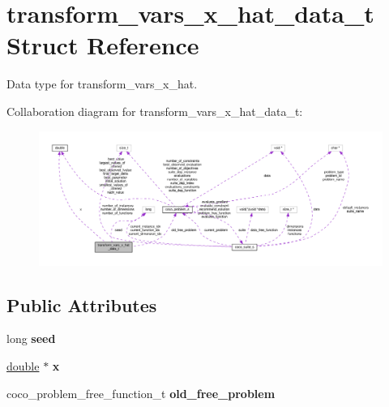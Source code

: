 \hypertarget{structtransform__vars__x__hat__data__t}{}\section{transform\+\_\+vars\+\_\+x\+\_\+hat\+\_\+data\+\_\+t Struct Reference}
\label{structtransform__vars__x__hat__data__t}


Data type for transform\+\_\+vars\+\_\+x\+\_\+hat.  




Collaboration diagram for transform\+\_\+vars\+\_\+x\+\_\+hat\+\_\+data\+\_\+t\+:\nopagebreak
\begin{figure}[H]
\begin{center}
\leavevmode
\includegraphics[width=350pt]{structtransform__vars__x__hat__data__t__coll__graph}
\end{center}
\end{figure}
\subsection*{Public Attributes}
\begin{DoxyCompactItemize}
\item 
long {\bfseries seed}\hypertarget{structtransform__vars__x__hat__data__t_abd1d575cde704bfd4f3c8820843372f7}{}\label{structtransform__vars__x__hat__data__t_abd1d575cde704bfd4f3c8820843372f7}

\item 
\hyperlink{classdouble}{double} $\ast$ {\bfseries x}\hypertarget{structtransform__vars__x__hat__data__t_aefe1053e7ed46717e89504ba37584ab7}{}\label{structtransform__vars__x__hat__data__t_aefe1053e7ed46717e89504ba37584ab7}

\item 
coco\+\_\+problem\+\_\+free\+\_\+function\+\_\+t {\bfseries old\+\_\+free\+\_\+problem}\hypertarget{structtransform__vars__x__hat__data__t_a22cf5774ed6b103e1abd54d9d45bdb96}{}\label{structtransform__vars__x__hat__data__t_a22cf5774ed6b103e1abd54d9d45bdb96}

\end{DoxyCompactItemize}


